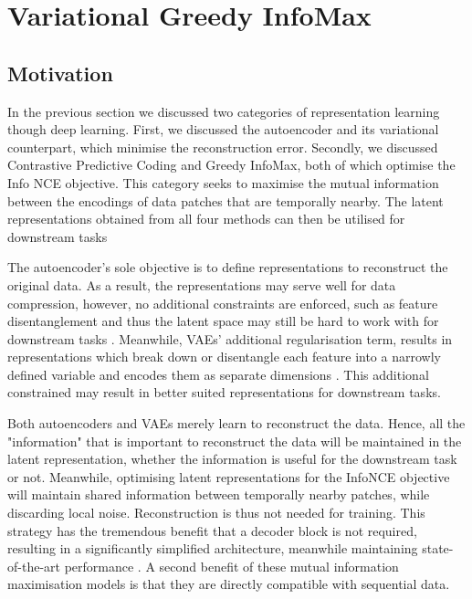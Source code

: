 \chapter{Variational Greedy InfoMax}

\section{Motivation} %
	In the previous section we discussed two categories of representation learning though deep learning. First, we discussed the autoencoder and its variational counterpart, which minimise the reconstruction error. Secondly, we discussed Contrastive Predictive Coding and Greedy InfoMax, both of which optimise the Info NCE objective. This category seeks to maximise the mutual information between the encodings of data patches that are temporally nearby. The latent representations obtained from all four methods can then be utilised for downstream tasks \cite{bengioRepresentationLearningReview2013, weiRecentAdvancesVariational2021, oordRepresentationLearningContrastive2019, lowePuttingEndEndtoEnd2020}
	
		The autoencoder's sole objective is to define representations to reconstruct the original data. As a result, the representations may serve well for data compression, however, no additional constraints are enforced, such as feature disentanglement and thus the latent space may still be hard to work with for downstream tasks \cite{tschannenRecentAdvancesAutoencoderBased2018}. Meanwhile, VAEs' additional regularisation term, results in representations which break down or disentangle each feature into a narrowly defined variable and encodes them as separate dimensions \cite{weiRecentAdvancesVariational2021}. This additional constrained may result in better suited representations for downstream tasks. %

		Both autoencoders and VAEs merely learn to reconstruct the data. Hence, all the "information" that is important to reconstruct the data will be maintained in the latent representation, whether the information is useful for the downstream task or not. Meanwhile, optimising latent representations for the InfoNCE objective will maintain shared information between temporally nearby patches, while discarding local noise. Reconstruction is thus not needed for training. This strategy has the tremendous benefit that a decoder block is not required, resulting in a significantly simplified architecture, meanwhile maintaining state-of-the-art performance \cite{stackeEvaluationContrastivePredictive2020}. A second benefit of these mutual information maximisation models is that they are directly compatible with sequential data.
		

